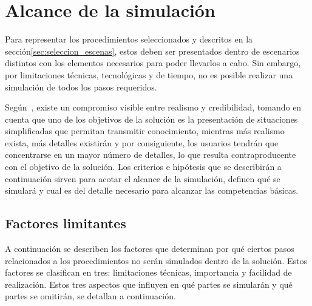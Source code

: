 \section{Alcance de la simulación}
\label{sec:alcance}

Para representar los procedimientos seleccionados y descritos en la
sección\ref{sec:seleccion_escenas}, estos deben ser presentados dentro de
escenarios distintos con los elementos necesarios para poder llevarlos a cabo.
Sin embargo, por limitaciones técnicas, tecnológicas y de tiempo, no es posible
realizar una simulación de todos los pasos requeridos.

Según~\cite{videojuegos:gonzaleztardon}, existe un compromiso visible entre
realismo y credibilidad, tomando en cuenta que uno de los objetivos de la
solución es la presentación de situaciones simplificadas que permitan transmitir
conocimiento, mientras más realismo exista, más detalles existirán y por
consiguiente, los usuarios tendrán que concentrarse en un mayor número de
detalles, lo que resulta contraproducente con el objetivo de la
solución\cite{videojuegos:gonzaleztardon}. Los criterios e hipótesis que se 
describirán a continuación sirven para acotar el
alcance de la simulación, definen qué se simulará y cual es del detalle
necesario para alcanzar las competencias básicas.



\subsection{Factores limitantes}

A continuación se describen los factores que determinan por qué ciertos pasos relacionados 
a los procedimientos no serán simulados dentro de la solución. Estos factores se clasifican 
en tres: limitaciones técnicas, importancia y facilidad de realización. Estos tres aspectos 
que influyen en qué partes se simularán y qué partes se omitirán, se detallan a continuación.


